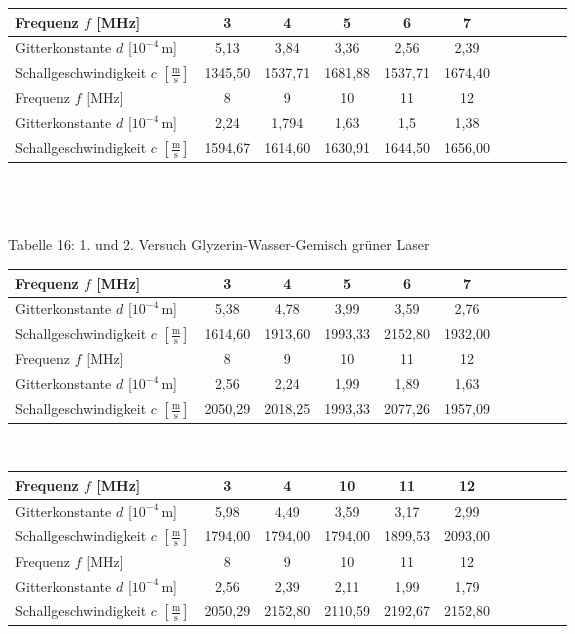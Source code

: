 \documentclass[fontsize=12pt]{scrartcl}
\begin{document}
\begin{tabular}{|l|c|c|c|c|c|c|c|c|c|c|} \hline
Frequenz $f$ [MHz] & 3 & 4 & 5 & 6 & 7 \\ \hline
Gitterkonstante $d$ [$10^{-4}$\,m] & 5,13 & 3,84 & 3,36 & 2,56 & 2,39  \\ \hline
Schallgeschwindigkeit $c$ $[\frac{{\text{m}}}{{\text{s}}}]$ & 1345,50 & 1537,71 & 1681,88 & 1537,71 & 1674,40  \\ \hline
Frequenz $f$ [MHz] &  8 & 9 & 10 & 11 & 12\\ \hline
Gitterkonstante $d$ [$10^{-4}$\,m] &  2,24 & 1,794 & 1,63 & 1,5 & 1,38 \\ \hline
Schallgeschwindigkeit $c$ $[\frac{{\text{m}}}{{\text{s}}}]$ & 1594,67 & 1614,60 & 1630,91 & 1644,50 & 1656,00  \\ \hline
\end{tabular} \\
~\\
~\\
Tabelle 16: 1. und 2. Versuch Glyzerin-Wasser-Gemisch grüner Laser\\
\begin{tabular}{|l|c|c|c|c|c|c|c|c|c|c|} \hline
Frequenz $f$ [MHz] & 3 & 4 & 5 & 6 & 7 \\ \hline
Gitterkonstante $d$ [$10^{-4}$\,m] & 5,38 & 4,78 & 3,99 & 3,59 & 2,76   \\ \hline
Schallgeschwindigkeit $c$ $[\frac{{\text{m}}}{{\text{s}}}]$ & 1614,60 & 1913,60 & 1993,33 & 2152,80 & 1932,00  \\ \hline
Frequenz $f$ [MHz] & 8 & 9 & 10 & 11 & 12\\ \hline
Gitterkonstante $d$ [$10^{-4}$\,m] &  2,56 & 2,24 & 1,99 &  1,89  & 1,63  \\ \hline
Schallgeschwindigkeit $c$ $[\frac{{\text{m}}}{{\text{s}}}]$ & 2050,29 &  2018,25 & 1993,33 & 2077,26 & 1957,09  \\ \hline
\end{tabular} \\
\begin{tabular}{|l|c|c|c|c|c|c|c|c|c|c|} \hline
Frequenz $f$ [MHz] & 3 & 4 & 10 & 11 & 12\\ \hline
Gitterkonstante $d$ [$10^{-4}$\,m] & 5,98 & 4,49 & 3,59 & 3,17 & 2,99   \\ \hline
Schallgeschwindigkeit $c$ $[\frac{{\text{m}}}{{\text{s}}}]$ & 1794,00 & 1794,00 & 1794,00 & 1899,53 & 2093,00   \\ \hline
Frequenz $f$ [MHz] & 8 & 9 & 10 & 11 & 12\\ \hline
Gitterkonstante $d$ [$10^{-4}$\,m] &  2,56 & 2,39 & 2,11 & 1,99 & 1,79  \\ \hline
Schallgeschwindigkeit $c$ $[\frac{{\text{m}}}{{\text{s}}}]$ & 2050,29 & 2152,80 & 2110,59 & 2192,67 & 2152,80  \\ \hline
\end{tabular}\\
\end{document}
